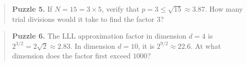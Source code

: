 \begin{quote}
\textbf{Puzzle 5.} If \(N = 15 = 3 \times 5\), verify that \(p = 3 \le \sqrt{15} \approx 3.87\). How many trial divisions would it take to find the factor \(3\)?
\end{quote}

\begin{quote}
\textbf{Puzzle 6.} The LLL approximation factor in dimension \(d = 4\) is \(2^{3/2} = 2\sqrt{2} \approx 2.83\). In dimension \(d = 10\), it is \(2^{9/2} \approx 22.6\). At what dimension does the factor first exceed \(1000\)?
\end{quote}
